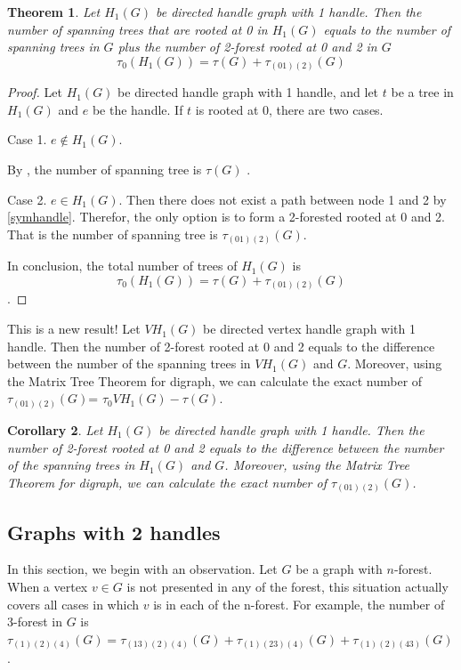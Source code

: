 \documentclass[twoside,11pt]{article}
\newtheorem{theorem}{Theorem}[section]
\newtheorem{corollary}[theorem]{Corollary}
\numberwithin{equation}{section} \DeclareMathOperator{\Var}{Var}
\newcommand{\bpf}{\begin{proof}}
\newcommand{\epf}{\end{proof}}
\newcommand{\bcor}{\begin{corollary}}
\newcommand{\ecor}{\end{corollary}}
\newcommand{\bthm}{\begin{theorem}}
\newcommand{\ethm}{\end{theorem}}
\begin{document}
\bthm\label{DH1 rooted at 0}
Let $H_1(G)$ be directed handle graph with 1 handle. Then the number of spanning trees that are rooted at 0 in $H_1(G)$ equals to the number of spanning trees in $G$ plus the number of 2-forest rooted at 0 and 2 in $G$\[
 \tau_0 (H_1(G)) = \tau(G)+\tau_{(01)(2)}(G) 
\]
\ethm

\bpf
Let $H_1(G)$ be directed handle graph with 1 handle, and let $t$ be a tree in $H_1(G)$ and $e$ be the handle. If $t$ is rooted at 0, there are two cases.

Case 1. $e\notin H_1(G)$. 

By , the number of spanning tree is $\tau(G)$ .

Case 2. $e \in H_1(G)$. 
Then there does not exist a path between node 1 and 2 by \cref{symhandle}. Therefor, the only option is to form a 2-forested rooted at 0 and 2. That is the number of spanning tree is $\tau_{(01)(2)}(G)$.

In conclusion, the total number of trees of $H_1(G)$ is  \\
$$\tau_0 (H_1(G)) = \tau(G)+\tau_{(01)(2)}(G)$$ .
\epf


This is a new result! Let $VH_1(G)$ be directed vertex handle graph with 1 handle. Then the number of 2-forest rooted at 0 and 2 equals to the difference between the number of the spanning trees in $VH_1(G)$ and $G$. Moreover, using the Matrix Tree Theorem for digraph, we can calculate the exact number of $\tau_{(01)(2)}(G)$= $\tau_0 VH_1(G) - \tau(G)$.


\bcor
Let $H_1(G)$ be directed handle graph with 1 handle. Then the number of 2-forest rooted at 0 and 2 equals to the difference between the number of the spanning trees in $H_1(G)$ and $G$. Moreover, using the Matrix Tree Theorem for digraph, we can calculate the exact number of $\tau_{(01)(2)}(G)$.
\ecor

\subsection{Graphs with 2 handles}

In this section, we begin with an observation. Let $G$ be a graph with $n$-forest. When a vertex $v\in G$ is not presented in any of the forest, this situation actually covers all cases in which $v$ is in each of the n-forest. For example, the number of 3-forest in $G$ is\\ $\tau_{(1)(2)(4)}(G)=\tau_{(13)(2)(4)}(G)+\tau_{(1)(23)(4)}(G)+\tau_{(1)(2)(43)}(G)$.
\end{document}
